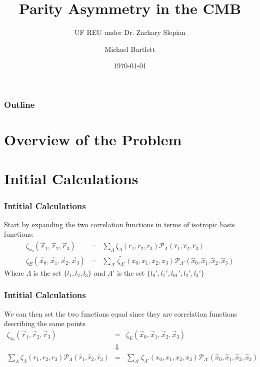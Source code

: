 \documentclass{beamer}
\title{Parity Asymmetry in the CMB}
\subtitle{UF REU under Dr. Zachary Slepian}
\author{Michael Bartlett}
\institute{University of Oklahoma}
\date{\today}
\begin{document}
\begin{frame}
    \titlepage
\end{frame}

\begin{frame}
    \frametitle{Outline}
    \tableofcontents
\end{frame}

\section{Overview of the Problem}

\section{Initial Calculations}
    \begin{frame}
        \frametitle{Intitial Calculations}
        Start by expanding the two correlation functions in terms of isotropic basis functions:
        \begin{eqnarray*}
            \zeta_{x_0} (\vec r_1, \vec r_2, \vec r_3) &=& \sum_{\Lambda} \tilde{\zeta_{\Lambda}}(r_1, r_2, r_3) \mathcal P_{\Lambda}(\hat r_1, \hat r_2, \hat r_3)\\
            \zeta_E (\vec x_0, \vec x_1, \vec x_2, \vec x_3) &=& \sum_{\Lambda '} \tilde{\zeta_{\Lambda '}}(x_0, x_1, x_2, x_3) \mathcal P_{\Lambda '}(\hat x_0, \hat x_1, \hat x_2, \hat x_3)
        \end{eqnarray*}
        Where $\Lambda$ is the set $\{l_1, l_2, l_3\}$ and $\Lambda'$ is the set $\{l_0', l_1', l_{01}', l_2', l_3'\}$
    \end{frame}

    \begin{frame}
        \frametitle{Intitial Calculations}
        We can then set the two functions equal since they are correlation functions describing the same points
        \begin{eqnarray*}
            \zeta_{x_0} (\vec r_1, \vec r_2, \vec r_3) &=& \zeta_E (\vec x_0, \vec x_1, \vec x_2, \vec x_3)\\
            &\Downarrow&\\
            \sum_{\Lambda} \zeta_{\Lambda}(r_1, r_2, r_3) \mathcal P_{\Lambda}(\hat r_1, \hat r_2, \hat r_3) &=& \sum_{\Lambda '} \zeta_{\Lambda '}(x_0, x_1, x_2, x_3) \mathcal P_{\Lambda '}(\hat x_0, \hat x_1, \hat x_2, \hat x_3)
        \end{eqnarray*}
    \end{frame}
\end{document}
